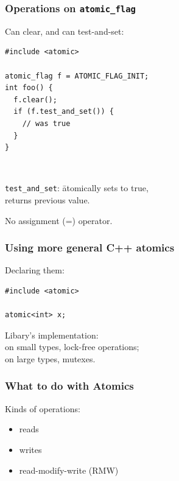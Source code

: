 \documentclass[aspectratio=43]{beamer}
\newenvironment{changemargin}[1]{%
  \begin{list}{}{%
    \setlength{\topsep}{0pt}%
    \setlength{\leftmargin}{#1}%
    \setlength{\rightmargin}{1em}
    \setlength{\listparindent}{\parindent}%
    \setlength{\itemindent}{\parindent}%
    \setlength{\parsep}{\parskip}%
  }%
  \item[]}{\end{list}}
\begin{document}
\begin{frame}[fragile]
  \frametitle{Operations on {\tt atomic\_flag}}
  \begin{changemargin}{2cm}
    Can clear, and can test-and-set:
    \begin{lstlisting}
#include <atomic>

atomic_flag f = ATOMIC_FLAG_INIT;
int foo() {
  f.clear();
  if (f.test_and_set()) {
    // was true
  }
}
    \end{lstlisting}
    ~\\
    \begin{tabbing}
      {\tt test\_and\_set}: \= atomically sets to true, \\
      \> returns previous value.
    \end{tabbing}
    No assignment (=) operator.
  \end{changemargin}
\end{frame}

\begin{frame}[fragile]
  \frametitle{Using more general C++ atomics}

  \begin{changemargin}{1cm}
    Declaring them:
  \end{changemargin}
\begin{lstlisting}
#include <atomic>

atomic<int> x;
\end{lstlisting}
  \begin{changemargin}{1cm}
Libary's implementation: \\
\hspace*{1em} on small types, lock-free operations;\\
\hspace*{1em} on large types, mutexes.
  \end{changemargin}

\end{frame}

\begin{frame}
  \frametitle{What to do with Atomics}

  \begin{changemargin}{2cm}
    \Large
    Kinds of operations:
    \begin{itemize}
    \item reads
    \item writes
    \item read-modify-write (RMW)
    \end{itemize}
  \end{changemargin}
\end{frame}
\end{document}
